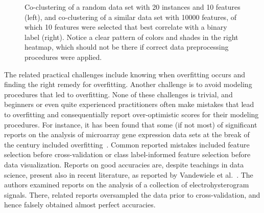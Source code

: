 \begin{refsection}
\begin{figure}[htbp]
\label{fig:heatmaps-overfitting}
\caption{Co-clustering of a random data set with 20 instances and 10 features (left), and co-clustering of a similar data set with 10000 features, of which 10 features were selected that best correlate with a binary label (right). Notice a clear pattern of colors and shades in the right heatmap, which should not be there if correct data preprocessing procedures were applied.}
\end{figure}

The related practical challenges include knowing when overfitting occurs and finding the right remedy for overfitting. Another challenge is to avoid modeling procedures that led to overfitting. None of these challenges is trivial, and beginners or even quite experienced practitioners often make mistakes that lead to overfitting and consequentially report over-optimistic scores for their modeling procedures. For instance, it has been found that some (if not most) of significant reports on the analysis of microarray gene expression data sets at the break of the century included overfitting~\cite{2003-Simon}. Common reported mistakes included feature selection before cross-validation or class label-informed feature selection before data visualization. Reports on good accuracies are, despite teachings in data science, present also in recent literature, as reported by Vandewiele et al.~\cite{2019-Vandewiele}. The authors examined reports on the analysis of a collection of electrohysterogram signals. There, related reports oversampled the data prior to cross-validation, and hence falsely obtained almost perfect accuracies.



\end{refsection}
